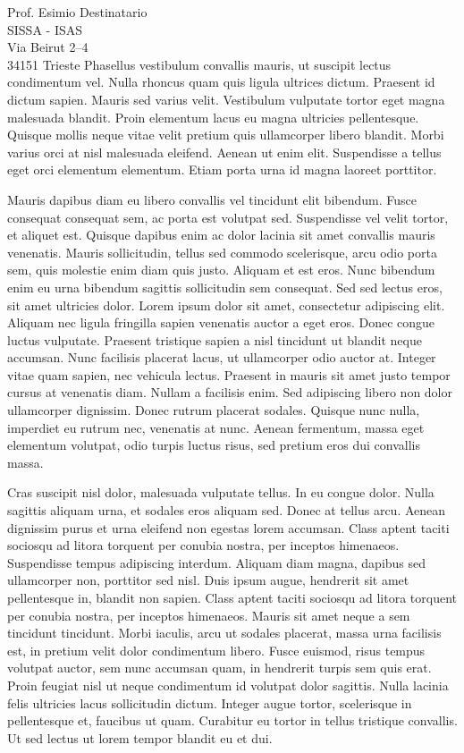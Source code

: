 \documentclass[10pt,italian,a4paper]{letteracdp}
\begin{document}
\begin{foldedletter}{
    Prof. Esimio Destinatario\\
    SISSA - ISAS\\
    Via Beirut 2--4\\
    34151 Trieste
  }
Phasellus vestibulum convallis mauris, ut suscipit lectus condimentum vel. Nulla rhoncus quam quis ligula ultrices dictum. Praesent id dictum sapien. Mauris sed varius velit. Vestibulum vulputate tortor eget magna malesuada blandit. Proin elementum lacus eu magna ultricies pellentesque. Quisque mollis neque vitae velit pretium quis ullamcorper libero blandit. Morbi varius orci at nisl malesuada eleifend. Aenean ut enim elit. Suspendisse a tellus eget orci elementum elementum. Etiam porta urna id magna laoreet porttitor.

Mauris dapibus diam eu libero convallis vel tincidunt elit bibendum. Fusce consequat consequat sem, ac porta est volutpat sed. Suspendisse vel velit tortor, et aliquet est. Quisque dapibus enim ac dolor lacinia sit amet convallis mauris venenatis. Mauris sollicitudin, tellus sed commodo scelerisque, arcu odio porta sem, quis molestie enim diam quis justo. Aliquam et est eros. Nunc bibendum enim eu urna bibendum sagittis sollicitudin sem consequat. Sed sed lectus eros, sit amet ultricies dolor. Lorem ipsum dolor sit amet, consectetur adipiscing elit. Aliquam nec ligula fringilla sapien venenatis auctor a eget eros. Donec congue luctus vulputate. Praesent tristique sapien a nisl tincidunt ut blandit neque accumsan. Nunc facilisis placerat lacus, ut ullamcorper odio auctor at. Integer vitae quam sapien, nec vehicula lectus. Praesent in mauris sit amet justo tempor cursus at venenatis diam. Nullam a facilisis enim. Sed adipiscing libero non dolor ullamcorper dignissim. Donec rutrum placerat sodales. Quisque nunc nulla, imperdiet eu rutrum nec, venenatis at nunc. Aenean fermentum, massa eget elementum volutpat, odio turpis luctus risus, sed pretium eros dui convallis massa.

Cras suscipit nisl dolor, malesuada vulputate tellus. In eu congue dolor. Nulla sagittis aliquam urna, et sodales eros aliquam sed. Donec at tellus arcu. Aenean dignissim purus et urna eleifend non egestas lorem accumsan. Class aptent taciti sociosqu ad litora torquent per conubia nostra, per inceptos himenaeos. Suspendisse tempus adipiscing interdum. Aliquam diam magna, dapibus sed ullamcorper non, porttitor sed nisl. Duis ipsum augue, hendrerit sit amet pellentesque in, blandit non sapien. Class aptent taciti sociosqu ad litora torquent per conubia nostra, per inceptos himenaeos. Mauris sit amet neque a sem tincidunt tincidunt. Morbi iaculis, arcu ut sodales placerat, massa urna facilisis est, in pretium velit dolor condimentum libero. Fusce euismod, risus tempus volutpat auctor, sem nunc accumsan quam, in hendrerit turpis sem quis erat. Proin feugiat nisl ut neque condimentum id volutpat dolor sagittis. Nulla lacinia felis ultricies lacus sollicitudin dictum. Integer augue tortor, scelerisque in pellentesque et, faucibus ut quam. Curabitur eu tortor in tellus tristique convallis. Ut sed lectus ut lorem tempor blandit eu et dui.


\end{foldedletter}
\end{document}
